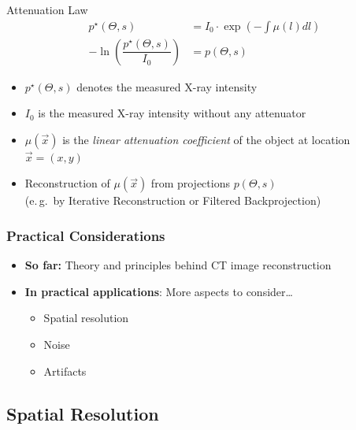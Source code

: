 \begin{frame}{Attenuation Law}
    \begin{align*}
        p^{\star}(\Theta, s)                               & = I_0 \cdot \exp\left(-\int	\mu(l)dl\right) \\
        -\ln\left(\dfrac{p^{\star}(\Theta, s)}{I_0}\right) & = p(\Theta, s) \tag{Radon transform}
    \end{align*}
    \begin{itemize}
        \item $p^{\star}(\Theta, s)$ denotes the measured X-ray intensity
        \item $I_0$ is the measured X-ray intensity without any attenuator
        \item $\mu(\vec x)$ is the \textit{linear attenuation coefficient} of the object at location $\vec x = (x ,y)$
        \item Reconstruction of $\mu(\vec x)$ from projections $p(\Theta, s)$\\ (e.\,g.\ by Iterative Reconstruction or Filtered Backprojection)
    \end{itemize}
\end{frame}

\begin{frame}
	\frametitle{Practical Considerations}

	\begin{itemize}
		\setlength\itemsep{0.5cm}
		\item \textcolor{faublue}{\textbf{So far:}} Theory and principles behind CT image reconstruction
		\item \textcolor{faublue}{\textbf{In practical applications}}: More aspects to consider\ldots
		      \begin{itemize}
			      \item Spatial resolution
			      \item Noise
			      \item Artifacts
		      \end{itemize}
	\end{itemize}

\end{frame}


\subsection{Spatial Resolution}

